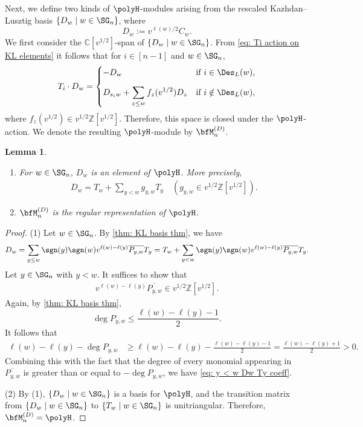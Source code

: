 \documentclass[12pt, reqno]{amsart}
\theoremstyle{plain}
\newtheorem{lemma}[lemma]{Lemma}
\theoremstyle{definition}
\numberwithin{equation}{section}
\numberwithin{figure}{section}
\numberwithin{table}{section}
\def\Z{\mathbb Z}
\def\C{\mathbb C}
\begin{document}
Next, we define two kinds of $\polyH$-modules arising from the rescaled
Kazhdan--Lusztig basis $\{D_w \mid w\in \SG_n\}$, where
\[
D_w := v^{\ell(w)/2} C_w.
\]
We first consider the $\C[v^{1/2}]$-span of $\{D_w \mid w \in \SG_n \}$.
From \cref{eq: Ti action on KL elements} it follows that for $i \in [n-1]$ and $w \in \SG_n$,
\begin{align}\label{eq: analogue of KL elts}
T_i \cdot D_w = \begin{cases}
- D_w & \text{if $i \in \Des_L(w)$,} \\[2ex]
\displaystyle D_{s_i w} + \sum_{z \le w} f_z(v^{1/2}) D_z & \text{if $i \notin \Des_L(w)$,}
\end{cases}
\end{align}
where $f_z(v^{1/2}) \in v^{1/2}\Z[v^{1/2}]$.
Therefore, this  space is closed under the $\polyH$-action. 
We denote the resulting $\polyH$-module by $\bfM^{(D)}_n$.



\begin{lemma}\label{lem: Dw in polyH}
\begin{enumerate}[label = {\rm (\arabic*)}]
\item 
For $w \in \SG_n$, $D_w$ is an element of $\polyH$. 
More precisely,
\begin{align*}
D_w = T_w + \sum_{y < w} g_{y, w} T_y \quad(g_{y, w} \in v^{1/2} \Z[v^{1/2}]).
\end{align*}
\item 
$\bfM^{(D)}_n$ is the regular representation of $\polyH$. 
\end{enumerate}
\end{lemma}
\begin{proof}
(1) Let $w \in \SG_n$.
By \cref{thm: KL basis thm}, we have
\begin{align*}
D_w =  \sum_{y \le w} \sgn(y)\sgn(w) v^{\ell(w) - \ell(y)} \overline{P_{y,w}} T_y = T_w + \sum_{y < w} \sgn(y)\sgn(w) v^{\ell(w) - \ell(y)} \overline{P_{y,w}} T_y. 
\end{align*}
Let  $y \in \SG_n$ with $y < w$.
It suffices to show that
\begin{align}\label{eq: y < w Dw Ty coeff} 
v^{\ell(w)-\ell(y)}\overline{P_{y,w}} \in v^{1/2}\Z[v^{1/2}].
\end{align} 
Again, by \cref{thm: KL basis thm},
\[ 
\deg P_{y,w} \leq \frac{\ell(w)-\ell(y)-1}{2}. 
\]
It follows that
\begin{align*}
\ell(w) - \ell(y) - \deg P_{y, w} 
&\geq \ell(w) - \ell(y) - \frac{\ell(w) - \ell(y) - 1}{2} 
= \frac{\ell(w) - \ell(y) + 1}{2} 
> 0.
\end{align*}
Combining this with the fact that the degree of every monomial appearing in $\overline{P_{y,w}}$ is greater than or equal to $-\deg P_{y,w}$, we have \cref{eq: y < w Dw Ty coeff}.

(2) By (1), $\{ D_w \mid w \in \SG_n \}$ is a basis for $\polyH$, and the transition matrix from $\{ D_w \mid w \in \SG_n \}$ to $\{ T_w \mid w \in \SG_n \}$ is unitriangular.
Therefore, $\bfM^{(D)}_n = \polyH$.
\end{proof}
\end{document}
